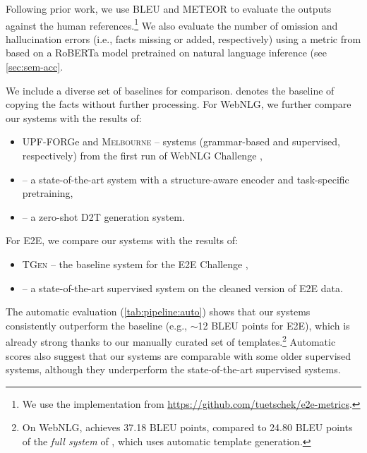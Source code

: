 Following prior work, we use BLEU \cite{papineni2002bleu} and METEOR \cite{banerjee-lavie-2005-meteor} to evaluate the outputs against the human references.\footnote{We use the implementation from \url{https://github.com/tuetschek/e2e-metrics}.} We also evaluate the number of omission and hallucination errors (i.e., facts missing or added, respectively) using a metric from \citet{dusekEvaluatingSemanticAccuracy2020} based on a RoBERTa model \cite{liuRoBERTaRobustlyOptimized2019} pretrained on natural language inference (see \autoref{sec:sem-acc}.

We include a diverse set of baselines for comparison. \baselinecopy{} denotes the baseline of copying the facts without further processing. For WebNLG, we further compare our systems with the results of:
\begin{itemize}
    \item UPF-FORGe and \textsc{Melbourne} -- systems (grammar-based and supervised, respectively) from the first run of WebNLG Challenge \cite{gardentWebNLGChallengeGenerating2017},
    \item  \citet{keJointGTGraphTextJoint2021} -- a state-of-the-art system with a structure-aware encoder and task-specific pretraining,
    \item \citet{laha2020scalable} -- a zero-shot D2T generation system.
\end{itemize}
For E2E, we compare our systems with the results of:
\begin{itemize}
    \item \textsc{TGen} \cite{dusekTrainingNaturalLanguage2015} -- the baseline system for the E2E Challenge \cite{dusekEvaluatingStateoftheartEndtoEnd2020},
    \item \citet{harkousHaveYourText2020} -- a state-of-the-art supervised system on the cleaned version of E2E data.
\end{itemize}

The automatic evaluation (\autoref{tab:pipeline:auto}) shows that our systems consistently outperform the \baselinecopy{} baseline (e.g., $\sim$12 BLEU points for E2E), which is already strong thanks to our manually curated set of templates.\footnote{On WebNLG, \baselinecopy{} achieves 37.18 BLEU points, compared to 24.80 BLEU points of the \textit{full system} of \citet{laha2020scalable}, which uses automatic template generation.} Automatic scores also suggest that our systems are comparable with some older supervised systems, although they underperform the state-of-the-art supervised systems.

